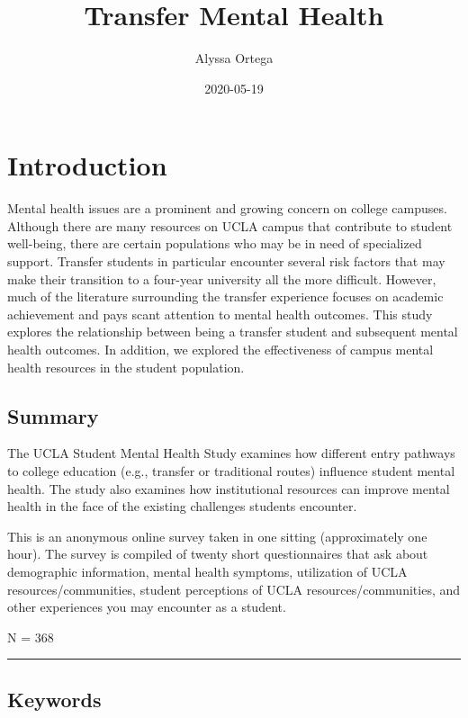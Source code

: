 \documentclass[]{book}
\title{Transfer Mental Health}
\author{Alyssa Ortega}
\date{2020-05-19}
\begin{document}
\maketitle

{
\setcounter{tocdepth}{1}
\tableofcontents
}
\hypertarget{introduction}{%
\chapter{Introduction}\label{introduction}}

Mental health issues are a prominent and growing concern on college campuses. Although there are many resources on UCLA campus that contribute to student well-being, there are certain populations who may be in need of specialized support. Transfer students in particular encounter several risk factors that may make their transition to a four-year university all the more difficult. However, much of the literature surrounding the transfer experience focuses on academic achievement and pays scant attention to mental health outcomes. This study explores the relationship between being a transfer student and subsequent mental health outcomes. In addition, we explored the effectiveness of campus mental health resources in the student population.

\hypertarget{summary}{%
\section{Summary}\label{summary}}

The UCLA Student Mental Health Study examines how different entry pathways to college education (e.g., transfer or traditional routes) influence student mental health. The study also examines how institutional resources can improve mental health in the face of the existing challenges students encounter.

This is an anonymous online survey taken in one sitting (approximately one hour). The survey is compiled of twenty short questionnaires that ask about demographic information, mental health symptoms, utilization of UCLA resources/communities, student perceptions of UCLA resources/communities, and other experiences you may encounter as a student.

N = 368

\begin{center}\rule{0.5\linewidth}{0.5pt}\end{center}

\hypertarget{keywords}{%
\section{Keywords}\label{keywords}}
\end{document}
